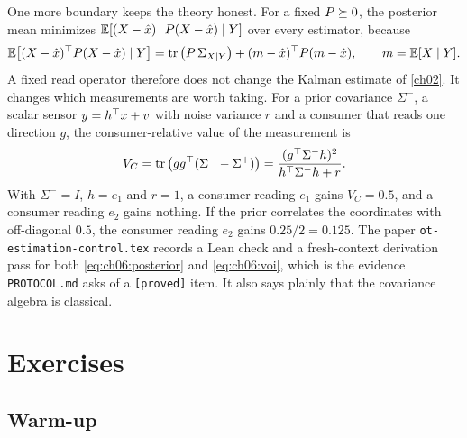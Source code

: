 One more boundary keeps the theory honest. For a fixed $P\succeq0$, the posterior mean minimizes $\mathbb{E}[(X-\hat x)^{\top} P(X-\hat x)\mid Y]$ over every estimator, because
\begin{equation}\label{eq:ch06:posterior}
\mathbb{E}\big[(X-\hat x)^{\top} P(X-\hat x)\mid Y\big]=\operatorname{tr}\big(P\,\Sigma_{X\mid Y}\big)+(m-\hat x)^{\top} P(m-\hat x),\qquad m=\mathbb{E}[X\mid Y].
\end{equation}
A fixed read operator therefore does not change the Kalman estimate of \cref{ch02}. It changes which measurements are worth taking. For a prior covariance $\Sigma^-$, a scalar sensor $y=h^{\top} x+v$ with noise variance $r$ and a consumer that reads one direction $g$, the consumer-relative value of the measurement is
\begin{equation}\label{eq:ch06:voi}
V_C=\operatorname{tr}\big(gg^{\top}(\Sigma^--\Sigma^+)\big)=\frac{(g^{\top}\Sigma^-h)^2}{h^{\top}\Sigma^-h+r}.
\end{equation}
With $\Sigma^-=I$, $h=e_1$ and $r=1$, a consumer reading $e_1$ gains $V_C=0.5$, and a consumer reading $e_2$ gains nothing. If the prior correlates the coordinates with off-diagonal $0.5$, the consumer reading $e_2$ gains $0.25/2=0.125$. The paper \texttt{ot-estimation-control.tex} records a Lean check and a fresh-context derivation pass for both \cref{eq:ch06:posterior} and \cref{eq:ch06:voi}, which is the evidence \texttt{PROTOCOL.md} asks of a \texttt{[proved]} item. It also says plainly that the covariance algebra is classical.



\section*{Exercises}

\subsection*{Warm-up}

